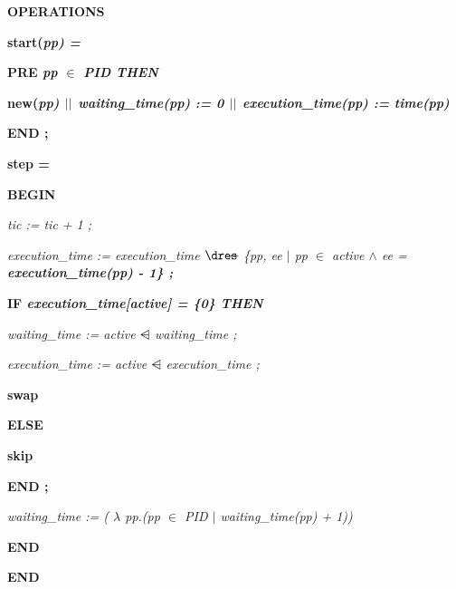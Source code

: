 \documentclass[11pt]{article}
\begin{document}
\begin{sloppypar}
\bf OPERATIONS

\bf start\rm (\it pp\rm ) \rm = 

\hspace*{0.20in}\bf PRE \it pp  $\in$  \it PID \bf THEN

\hspace*{0.40in}\bf new\rm (\it pp\rm )  $\mbox{$\mid\mid$}$  \bf waiting\_time\rm (\it pp\rm ) \rm := \rm 0  $\mbox{$\mid\mid$}$  \bf execution\_time\rm (\it pp\rm ) \rm := \it time\rm (\it pp\rm )

\hspace*{0.20in}\bf END \rm ;

\bf step \rm = 

\hspace*{0.20in}\bf BEGIN

\hspace*{0.40in}\it tic \rm := \it tic \rm + \rm 1 \rm ; 

\hspace*{0.40in}\it execution\_time \rm := \it execution\_time  $\lover$  \rm \{\it pp\rm , \it ee  $\mid$  \it pp  $\in$  \it active  $\land$  \it ee \rm = \bf execution\_time\rm (\it pp\rm ) \rm - \rm 1\rm \} \rm ; 

\hspace*{0.40in}\bf IF \it execution\_time\rm \rm [\it active\rm \rm ] \rm = \rm \{\rm 0\rm \} \bf THEN

\hspace*{0.60in}\it waiting\_time \rm := \it active  $\ndres$  \it waiting\_time \rm ; 

\hspace*{0.60in}\it execution\_time \rm := \it active  $\ndres$  \it execution\_time \rm ;

\hspace*{0.60in}\bf swap

\hspace*{0.40in}\bf ELSE

\hspace*{0.60in}\bf skip

\hspace*{0.40in}\bf END \rm ;

\hspace*{0.40in}\it waiting\_time \rm := \rm ( $\lambda$ \it pp\rm .\rm (\it pp  $\in$  \it PID  $\mid$  \it waiting\_time\rm (\it pp\rm ) \rm + \rm 1\rm )\rm )

\hspace*{0.20in}\bf END

\bf END\newpage
\end{sloppypar}
\end{document}
